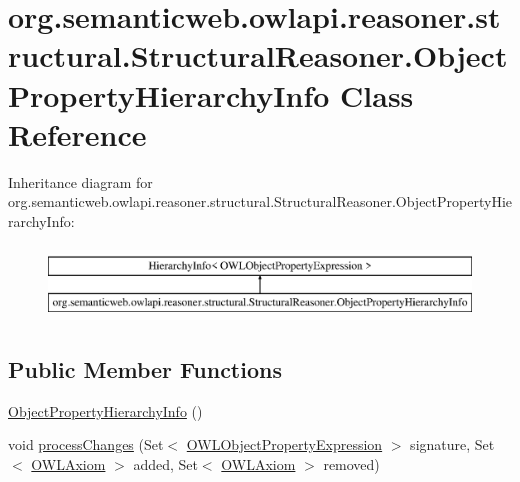 \hypertarget{classorg_1_1semanticweb_1_1owlapi_1_1reasoner_1_1structural_1_1_structural_reasoner_1_1_object_property_hierarchy_info}{\section{org.\-semanticweb.\-owlapi.\-reasoner.\-structural.\-Structural\-Reasoner.\-Object\-Property\-Hierarchy\-Info Class Reference}
\label{classorg_1_1semanticweb_1_1owlapi_1_1reasoner_1_1structural_1_1_structural_reasoner_1_1_object_property_hierarchy_info}
}
Inheritance diagram for org.\-semanticweb.\-owlapi.\-reasoner.\-structural.\-Structural\-Reasoner.\-Object\-Property\-Hierarchy\-Info\-:\begin{figure}[H]
\begin{center}
\leavevmode
\includegraphics[height=2.000000cm]{classorg_1_1semanticweb_1_1owlapi_1_1reasoner_1_1structural_1_1_structural_reasoner_1_1_object_property_hierarchy_info}
\end{center}
\end{figure}
\subsection*{Public Member Functions}
\begin{DoxyCompactItemize}
\item 
\hyperlink{classorg_1_1semanticweb_1_1owlapi_1_1reasoner_1_1structural_1_1_structural_reasoner_1_1_object_property_hierarchy_info_a843c65ef2f4588c60d14b9d0c4b54f3c}{Object\-Property\-Hierarchy\-Info} ()
\item 
void \hyperlink{classorg_1_1semanticweb_1_1owlapi_1_1reasoner_1_1structural_1_1_structural_reasoner_1_1_object_property_hierarchy_info_ae3b3b138f18346fda7aee78467b9b125}{process\-Changes} (Set$<$ \hyperlink{interfaceorg_1_1semanticweb_1_1owlapi_1_1model_1_1_o_w_l_object_property_expression}{O\-W\-L\-Object\-Property\-Expression} $>$ signature, Set$<$ \hyperlink{interfaceorg_1_1semanticweb_1_1owlapi_1_1model_1_1_o_w_l_axiom}{O\-W\-L\-Axiom} $>$ added, Set$<$ \hyperlink{interfaceorg_1_1semanticweb_1_1owlapi_1_1model_1_1_o_w_l_axiom}{O\-W\-L\-Axiom} $>$ removed)
\end{DoxyCompactItemize}
